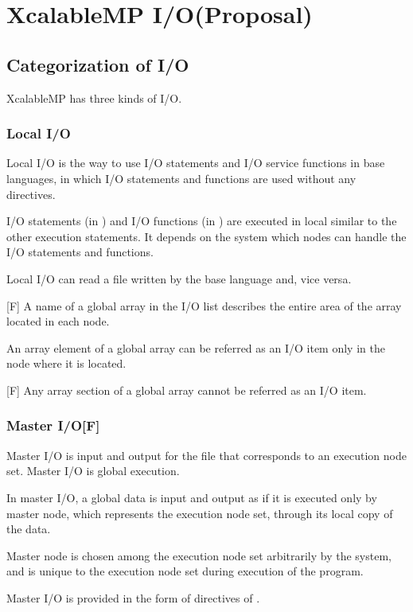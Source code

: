 
 \chapter{XcalableMP I/O(Proposal)}

 \section{Categorization of I/O}
 XcalableMP has three kinds of I/O.

  \subsection{Local I/O}

  Local I/O is the way to use I/O statements and I/O service functions in
  base languages, in which I/O statements and functions are used without
  any directives.

  I/O statements (in {\XMP} {\Fort}) and I/O functions (in {\XMP} {\C})
  are executed in local similar to the other execution statements.
  It depends on the system which nodes can handle the I/O statements and
  functions.

  Local I/O can read a file written by the base language and, vice
  versa.

  [F] A name of a global array in the I/O list describes the
  entire area of the array located in each node.

  An array element of a global array can be referred as an I/O item only
  in the node where it is located.

  [F] Any array section of a global array cannot be referred as an
  I/O item.

  \subsection{Master I/O[F]}

  Master I/O is input and output for the file that corresponds to an
  execution node set.
  Master I/O is global execution.

  In master I/O, a global data is input and output as if it is executed
  only by master node, which represents the execution node set, through
  its local copy of the data.

  Master node is chosen among the execution node set arbitrarily by the
  system, and is unique to the execution node set during execution of
  the program.

  Master I/O is provided in the form of directives of {\XMP} {\Fort}.

